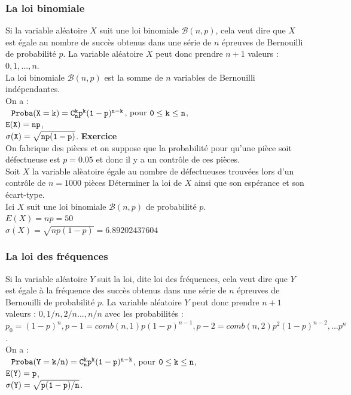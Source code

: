 \documentclass[a4paper,11pt]{book}
\begin{document}
\subsubsection{La loi binomiale}
Si la variable al\'eatoire $X$ 
suit une loi binomiale $\mathcal B(n,p)$, cela veut dire que $X$ est 
\'egale au nombre de succ\`es obtenus dans une s\'erie de $n$ \'epreuves de 
Bernouilli de probabilit\'e $p$. La variable al\'eatoire $X$ peut donc prendre 
$n+1$ valeurs : $0,1,...,n$.\\
La loi binomiale $\mathcal B(n,p)$ est
 la somme de $n$ variables de Bernouilli ind\'ependantes.\\
 On a :\\
${\tt \ \ Proba(X=k)=C_n^k p^k(1-p)^{n-k}}$, pour ${\tt 0 \leq k \leq n}$, \\
${\tt E(X)=np}$,\\
${\tt \sigma(X)=\sqrt{np(1-p)}}$.
{\bf Exercice}\\
On fabrique des pi\`eces et on suppose que la probabilit\'e pour qu'une 
pi\`ece soit d\'efectueuse est $p=0.05$ et donc il y a un contr\^ole de 
ces pi\`eces.\\
Soit $X$ la variable al\`eatoire \'egale au nombre de  d\'efectueuses 
trouv\'ees lors d'un contr\^ole de $n=1000$ pi\`eces
D\'eterminer la loi de $X$ ainsi que son esp\'erance et son \'ecart-type.\\
Ici $X$ suit une loi binomiale $\mathcal B(n,p)$ de probabilit\'e $p$.\\
$E(X)=np=50$\\
$\sigma(X)=\sqrt{np(1-p)}=6.89202437604$
\subsubsection{La loi des fr\'equences}
Si la variable al\'eatoire $Y$ 
suit la loi, dite loi des fr\'equences, cela veut dire que $Y$ est 
\'egale \`a la fr\'equence des succ\`es obtenus dans une s\'erie de $n$ 
\'epreuves de Bernouilli de probabilit\'e $p$. La variable al\'eatoire $Y$ peut
donc prendre $n+1$ valeurs : $0,1/n,2/n...,n/n$ avec les probabilit\'es :
$p_0=(1-p)^n,p-1=comb(n,1)p(1-p)^{n-1},p-2=comb(n,2)p^2(1-p)^{n-2},...p^n$.\\
 On a :\\
${\tt \ \ Proba(Y=k/n)=C_n^k p^k(1-p)^{n-k}}$, pour ${\tt 0 \leq k \leq n}$, \\
${\tt E(Y)=p}$,\\
${\tt \sigma(Y)=\sqrt{p(1-p)/n}}$.
\end{document}
